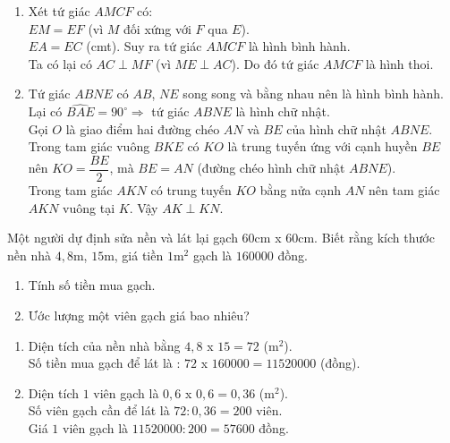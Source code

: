 \begin{bt}
{\begin{enumerate}
{   }
   	  	Chứng minh tương tự suy ra $DA=DB =\dfrac{1}{2}AB \quad (2)$.\\
   	Từ $(1)$ và $(2)$ suy ra $ME = BD$, mà $ME \parallel BD$ suy ra tứ giác $BDEM$ là hình bình hành.
    
   	\item Xét tứ giác $AMCF$ có:\\
   	$EM = EF$ (vì $M$ đối xứng với $F$ qua $E$).\\
   	$EA = EC$ (cmt). Suy ra tứ giác $AMCF$ là hình bình hành.\\
   	Ta có lại có $AC \perp MF$ (vì $ME \perp  AC$). Do đó tứ giác $AMCF$ là hình thoi.
   	\item Tứ giác $ABNE$ có $AB$, $NE$ song song và bằng nhau nên là hình bình hành.\\
   	Lại có $\widehat{BAE} = 90^\circ \Rightarrow $ tứ giác $ABNE$ là hình chữ nhật.\\
   	Gọi $O$ là giao điểm hai đường chéo $AN$ và $BE$ của hình chữ nhật $ABNE$.\\
   	Trong tam giác vuông $BKE$ có $KO$ là trung tuyến ứng với cạnh huyền $BE$
   	nên $KO =\dfrac{BE}{2}$, 					
   	mà $BE = AN$ (đường chéo hình chữ nhật $ABNE$).\\
   	Trong tam giác $AKN$ có trung tuyến $KO$ bằng nửa cạnh $AN$
   	nên tam giác $AKN$ vuông tại $K$. Vậy $AK \perp KN$.					
   \end{enumerate}
}
   	\end{bt}
   
\begin{bt}%
	Một người dự định sửa nền và lát lại gạch $60$cm x $60$cm. Biết rằng kích thước nền nhà $4{,}8$m, $15$m, giá tiền $1$m$^2$  gạch là $160000$ đồng.
	\begin{enumerate}
		\item Tính số tiền mua gạch.
	\item Ước lượng một viên gạch giá bao nhiêu?
	\end{enumerate}
	\loigiai
		{ \begin{enumerate}
				\item 	Diện tích của nền nhà bằng $4{,}8$ x $15 =  72$ (m$^2$).\\
				Số tiền mua gạch để lát là : $72$ x $160000 = 11520000$ (đồng).
				\item 	Diện tích $1$ viên gạch là $0{,}6$ x $ 0{,}6 = 0{,} 36$ (m$^2$).\\
				Số viên gạch cần để lát là $ 72 : 0{,}36 = 200$ viên.\\
				Giá $1$ viên gạch là $11520000 : 200 = 57600$ đồng.
						\end{enumerate}
		
			}
	
	\end{bt}


